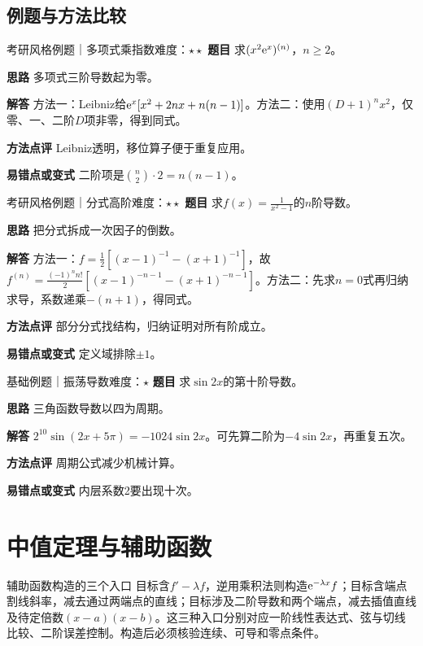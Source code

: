 \subsection{例题与方法比较}
\begin{example}{考研风格例题｜多项式乘指数}{难度：$\star\star$}
\label{ex:2:4}\textbf{题目} 求$(x^2\mathrm{e}^x)^{(n)}$，$n\ge2$。\par
\textbf{思路} 多项式三阶导数起为零。\par
\textbf{解答} 方法一：Leibniz给$\mathrm{e}^x[x^2+2nx+n(n-1)]$。方法二：使用$(D+1)^n x^2$，仅零、一、二阶$D$项非零，得到同式。\par
\textbf{方法点评} Leibniz透明，移位算子便于重复应用。\par
\textbf{易错点或变式} 二阶项是$\binom n2\cdot2=n(n-1)$。
\end{example}
\begin{example}{考研风格例题｜分式高阶}{难度：$\star\star$}
\label{ex:2:5}\textbf{题目} 求$f(x)=\frac{1}{x^2-1}$的$n$阶导数。\par
\textbf{思路} 把分式拆成一次因子的倒数。\par
\textbf{解答} 方法一：$f=\frac12[(x-1)^{-1}-(x+1)^{-1}]$，故$f^{(n)}=\frac{(-1)^n n!}{2}[(x-1)^{-n-1}-(x+1)^{-n-1}]$。方法二：先求$n=0$式再归纳求导，系数递乘$-(n+1)$，得同式。\par
\textbf{方法点评} 部分分式找结构，归纳证明对所有阶成立。\par
\textbf{易错点或变式} 定义域排除$\pm1$。
\end{example}
\begin{example}{基础例题｜振荡导数}{难度：$\star$}
\label{ex:2:6}\textbf{题目} 求$\sin2x$的第十阶导数。\par
\textbf{思路} 三角函数导数以四为周期。\par
\textbf{解答} $2^{10}\sin(2x+5\pi)=-1024\sin2x$。可先算二阶为$-4\sin2x$，再重复五次。\par
\textbf{方法点评} 周期公式减少机械计算。\par
\textbf{易错点或变式} 内层系数2要出现十次。
\end{example}
\section{中值定理与辅助函数}\label{sec:2:3}

\begin{method}{辅助函数构造的三个入口}
目标含$f\prime-\lambda f$，逆用乘积法则构造$\mathrm{e}^{-\lambda x}f$；目标含端点割线斜率，减去通过两端点的直线；目标涉及二阶导数和两个端点，减去插值直线及待定倍数$(x-a)(x-b)$。这三种入口分别对应一阶线性表达式、弦与切线比较、二阶误差控制。构造后必须核验连续、可导和零点条件。
\end{method}

